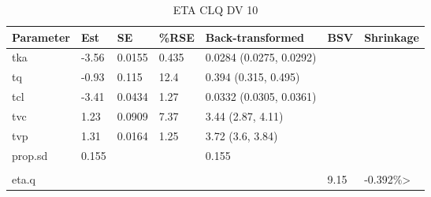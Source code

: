 \begin{table}
\centering\centering
\caption{ETA CLQ DV 10}
\centering
\fontsize{8}{10}\selectfont
\begin{tabular}[t]{lllllll}
\toprule
\textbf{Parameter} & \textbf{Est} & \textbf{SE} & \textbf{\%RSE} & \textbf{Back-transformed} & \textbf{BSV} & \textbf{Shrinkage}\\
\midrule
tka & -3.56 & 0.0155 & 0.435 & 0.0284 (0.0275, 0.0292) &  & \\
\midrule
tq & -0.93 & 0.115 & 12.4 & 0.394 (0.315, 0.495) &  & \\
\midrule
tcl & -3.41 & 0.0434 & 1.27 & 0.0332 (0.0305, 0.0361) &  & \\
\midrule
tvc & 1.23 & 0.0909 & 7.37 & 3.44 (2.87, 4.11) &  & \\
\midrule
tvp & 1.31 & 0.0164 & 1.25 & 3.72 (3.6, 3.84) &  & \\
\midrule
prop.sd & 0.155 &  &  & 0.155 &  & \\
\midrule\\
eta.q &  &  &  &  & 9.15 & -0.392\%>\\
\bottomrule
\end{tabular}
\end{table}